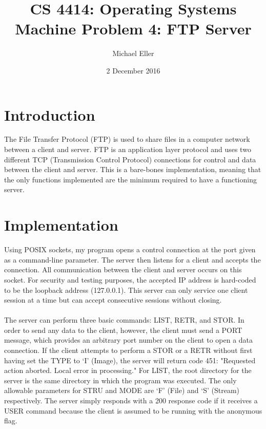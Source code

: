 \documentclass[12pt,letter,titlepage]{article}
\title{\blue CS 4414: Operating Systems\\
\blueb Machine Problem 4: FTP Server}
\author{Michael Eller}
\date{2 December 2016}
\begin{document}
\maketitle

\section*{Introduction}
The File Transfer Protocol (FTP) is used to share files in a computer network between a client and server. FTP is an application layer protocol and uses two different TCP (Transmission Control Protocol) connections for control and data between the client and server. This is a bare-bones implementation, meaning that the only functions implemented are the minimum required to have a functioning server.

\section*{Implementation}
Using POSIX sockets, my program opens a control connection at the port given as a command-line parameter. The server then listens for a client and accepts the connection. All communication between the client and server occurs on this socket. For security and testing purposes, the accepted IP address is hard-coded to be the loopback address (127.0.0.1). This server can only service one client session at a time but can accept consecutive sessions without closing. 
\\
\\
\noindent The server can perform three basic commands: {\color{orange}LIST}, {\color{orange}RETR}, and {\color{orange}STOR}. In order to send any data to the client, however, the client must send a {\color{orange}PORT} message, which provides an arbitrary port number on the client to open a data connection. If the client attempts to perform a {\color{orange}STOR} or a {\color{orange}RETR} without first having set the {\color{orange}TYPE} to `I' (Image), the server will return code 451: "Requested action aborted. Local error in processing." For {\color{orange}LIST}, the root directory for the server is the same directory in which the program was executed. The only allowable parameters for {\color{orange}STRU} and {\color{orange}MODE} are `F' (File) and `S' (Stream) respectively. The server simply responds with a 200 response code if it receives a {\color{orange}USER} command because the client is assumed to be running with the anonymous flag.
\pagebreak
\end{document}
